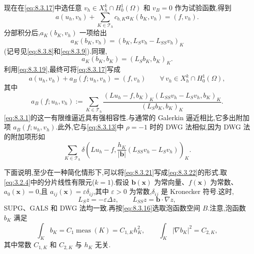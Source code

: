 现在在\eqref{eq:8.3.17}中选任意 \(v_h\in X_h^k\cap H_0^1(\Omega)\) 和 \(v_B=0\) 作为试验函数,得到
\[
  a(u_h,v_h)+\sum_{K\in\mathcal T_h}c_{b,K}a_K(b_K,v_h)=(f,v_h).
\]
分部积分后,\(a_K(b_K,v_h)\) 一项给出
\[
  a_K(b_K,v_h)=(b_K,L_Sv_h-L_{SS}v_h)_K
\]
(记号见\eqref{eq:8.3.8}和\eqref{eq:8.3.9}).同理,
\[
  a_K(b_K,b_K)=(L_Sb_K,b_K)_K.
\]
利用\eqref{eq:8.3.19},最终可将\eqref{eq:8.3.17}写成
\begin{equation}\label{eq:8.3.20}
  a(u_h,v_h)+a_B(f;u_h,v_h)=(f,v_h)\qquad\forall\,v_h\in X_h^k\cap H_0^1(\Omega),
\end{equation}
其中
\begin{equation}\label{eq:8.3.21}
  a_B(f;u_h,v_h):=\sum_{K\in\mathcal T_h}
      \frac{(Lu_h-f,b_K)_K(L_{SS}v_h-L_Sv_h,b_K)_K}{(L_Sb_K,b_K)_K}.
\end{equation}
\eqref{eq:8.3.1}的这一有限维逼近具有强相容性.与通常的 Galerkin 逼近相比,它多出附加项 \(a_B(f;u_h,v_h)\).此外,它与\eqref{eq:8.3.13}中 \(\rho=-1\) 时的 DWG 法相似,因为 DWG 法的附加项形如
\begin{equation}\label{eq:8.3.22}
  \sum_{K\in\mathcal T_h}\delta\left(
     Lu_h-f,\frac{h_K}{|\boldsymbol{b}|}(L_{SS}v_h-L_Sv_h)\right)_K.
\end{equation}

下面说明,至少在一种简化情形下,可以将\eqref{eq:8.3.21}写成\eqref{eq:8.3.22}的形式.取\eqref{eq:3.2.4}中的分片线性有限元(\(k=1\)).假设 \(\boldsymbol{b}(\boldsymbol{x})\) 为常向量、\(f(\boldsymbol{x})\) 为常数、\(a_0(\boldsymbol{x})=0\),且 \(a_{ij}(\boldsymbol{x})=\varepsilon\delta_{ij}\),其中 \(\varepsilon>0\) 为常数,\(\delta_{ij}\) 是 Kronecker 符号.这时,
\[
  L_Sz=-\varepsilon\Delta z,\qquad L_{SS}z=\boldsymbol{b}\cdot\nabla z,
\]
SUPG、GALS 和 DWG 法均一致.再按\eqref{eq:8.3.16}选取泡函数空间 \(B\).注意,泡函数 \(b_K\) 满足
\begin{equation}\label{eq:8.3.23}
  \int_Kb_K=C_1\operatorname{meas}(K)=C_{1,K}h_K^2,\qquad
    \int_K|\nabla b_K|^2=C_{2,K},
\end{equation}
其中常数 \(C_{1,K}\) 和 \(C_{2,K}\) 与 \(h_K\) 无关.

